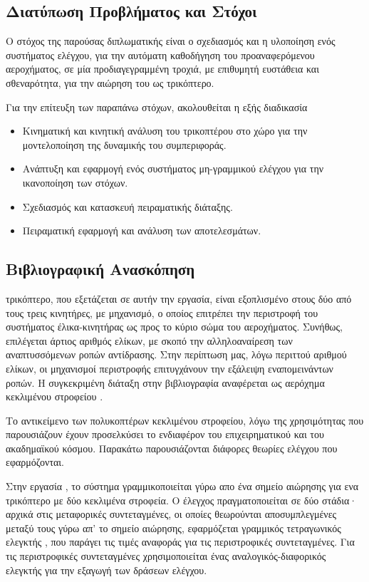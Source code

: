 \subsection{Διατύπωση Προβλήματος και Στόχοι}

\noindent Ο στόχος της παρούσας διπλωματικής είναι ο σχεδιασμός και η υλοποίηση 
ενός συστήματος ελέγχου, για την αυτόματη καθοδήγηση του προαναφερόμενου 
αεροχήματος, σε μία προδιαγεγραμμένη τροχιά, με επιθυμητή ευστάθεια και 
σθεναρότητα, για την αιώρηση του ως τρικόπτερο.

\noindent Για την επίτευξη των παραπάνω στόχων, ακολουθείται η εξής διαδικασία
\begin{itemize}
    \item Κινηματική και κινητική ανάλυση του τρικοπτέρου στο χώρο για την 
    μοντελοποίηση της δυναμικής του συμπεριφοράς.
    \item Ανάπτυξη και εφαρμογή ενός συστήματος μη-γραμμικού ελέγχου για την 
    ικανοποίηση των στόχων.
    \item Σχεδιασμός και κατασκευή πειραματικής διάταξης.
    \item Πειραματική εφαρμογή και ανάλυση των αποτελεσμάτων.
\end{itemize}

\subsection{Βιβλιογραφική Ανασκόπηση}

 τρικόπτερο, που εξετάζεται σε αυτήν την εργασία, είναι εξοπλισμένο 
στους δύο από τους τρεις κινητήρες, με μηχανισμό, ο οποίος επιτρέπει την 
περιστροφή του συστήματος έλικα-κινητήρας ως προς το κύριο σώμα του αεροχήματος.
Συνήθως, επιλέγεται άρτιος αριθμός ελίκων, με σκοπό την αλληλοαναίρεση των 
αναπτυσσόμενων ροπών αντίδρασης. Στην περίπτωση μας, λόγω περιττού αριθμού 
ελίκων, οι μηχανισμοί περιστροφής επιτυγχάνουν την εξάλειψη εναπομεινάντων 
ροπών. Η συγκεκριμένη διάταξη στην βιβλιογραφία αναφέρεται ως αερόχημα 
κεκλιμένου στροφείου .

    Το αντικείμενο των πολυκοπτέρων κεκλιμένου στροφείου, λόγω της χρησιμότητας
που παρουσιάζουν έχουν προσελκύσει το ενδιαφέρον του επιχειρηματικού και του
ακαδημαϊκού κόσμου. Παρακάτω παρουσιάζονται διάφορες θεωρίες ελέγχου που
εφαρμόζονται.

    Στην εργασία \cite{6699805}, το σύστημα γραμμικοποιείται γύρω απο ένα σημείο 
αιώρησης για ενα τρικόπτερο με δύο κεκλιμένα στροφεία. Ο έλεγχος
πραγματοποιείται σε δύο στάδια· αρχικά στις μεταφορικές συντεταγμένες, οι οποίες
θεωρούνται αποσυμπλεγμένες μεταξύ τους γύρω απ' το σημείο αιώρησης, εφαρμόζεται 
γραμμικός τετραγωνικός ελεγκτής , που παράγει τις τιμές αναφοράς για 
τις περιστροφικές συντεταγμένες. Για τις περιστροφικές συντεταγμένες 
χρησιμοποιείται ένας αναλογικός-διαφορικός ελεγκτής για την εξαγωγή των δράσεων
ελέγχου.

